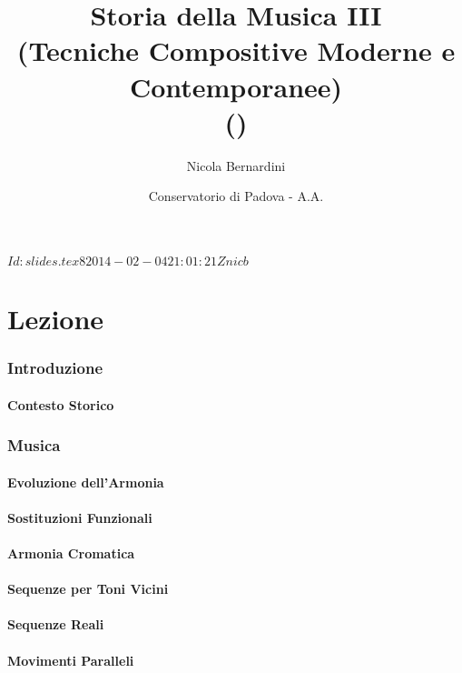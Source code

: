 \documentclass[\printmode,compress,xcolor=dvipsnames]{beamer}
\title[Storia della Musica III \lectnum]
{%
  Storia della Musica III \lectnum\\[-0.25\baselineskip]
  {\small (Tecniche Compositive Moderne e Contemporanee)}\\
	{\tiny (\rcstag)}
}
\author{%
	Nicola Bernardini\\
    \href{mailto:\cpholderemail}{\cpholderemail}
}
\institute[SME-CCPPD]%
{%
	\href{http://www.conservatoriopollini.it}
		 {Conservatorio di Musica ``C.Pollini'' -- Padova}\\
	\hhref{http://www.tecnosuono.org}
}
\date[Padova \AnnoAccademico]{Conservatorio di Padova - A.A. \AnnoAccademico}
\begin{document}
\svnInfo $Id: slides.tex 8 2014-02-04 21:01:21Z nicb $
  

\begin{frame}
	\titlepage
\end{frame}
  
\part{Lezione }
\section{Introduzione}
\subsection[Contesto]{Contesto Storico}
\section{Musica}
\subsection[Armonia]{Evoluzione dell'Armonia}
\subsection[Sostituzioni]{Sostituzioni Funzionali}
\subsection[Cromatismo]{Armonia Cromatica}
\subsection[Toni Vicini]{Sequenze per Toni Vicini}
\subsection[Seq. Reali]{Sequenze Reali}
\subsection[Mov. Paralleli]{Movimenti Paralleli}
\end{document}
